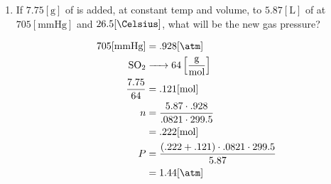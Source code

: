 \documentclass[12pt]{article}
\begin{document}
\begin{enumerate}
  \item If $7.75[\si{\gram}]$ of  is added, at constant temp and volume, to $5.87[\si{\liter}]$ of  at $705[\si{\mmHg}]$ and $26.5[\si{\Celsius}]$, what will be the new gas pressure?

    \begin{equation}
      \begin{split}
        705[\si{\mmHg}]&=.928[\si{\atm}]\\
        \ce{SO2 &->} 64\left[ \frac{\si{\gram}}{\si{\mole}} \right]\\
        \frac{7.75}{64}&=.121[\si{\mole}]\\
        n&=\frac{5.87\cdot.928}{.0821\cdot299.5}\\
        &=.222[\si{\mole}]\\
        P&=\frac{(.222+.121)\cdot.0821\cdot299.5}{5.87}\\
        &=1.44[\si{\atm}]
      \end{split}
      \label{7}
    \end{equation}

\end{enumerate}
\end{document}

